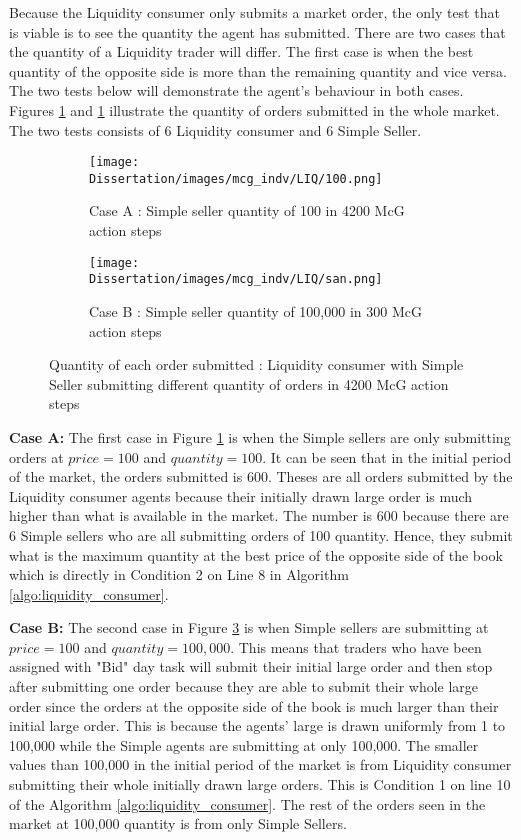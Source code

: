 Because the Liquidity consumer only submits a market order, the only test that is viable is to see the quantity the agent has submitted. There are two cases that the quantity of a Liquidity trader will differ. The first case is when the best quantity of the opposite side is more than the remaining quantity and vice versa. The two tests below will demonstrate the agent's behaviour in both cases. Figures \ref{fig:liq_indv_1} and \ref{fig:liq_indv_1} illustrate the quantity of orders submitted in the whole market. The two tests consists of 6 Liquidity consumer and 6 Simple Seller. 

\begin{figure}[h]
  \begin{subfigure}[b]{0.5\textwidth}
    \texttt{[image: Dissertation/images/mcg\_indv/LIQ/100.png]}
    \caption{Case A : Simple seller quantity of 100 in 4200 McG action steps}
    \label{fig:liq_indv_1}
  \end{subfigure}
  \begin{subfigure}[b]{0.5\textwidth}
    \texttt{[image: Dissertation/images/mcg\_indv/LIQ/san.png]}
    \caption{Case B : Simple seller quantity of 100,000 in 300 McG action steps}
    \label{fig:liq_indv_2}
  \end{subfigure}
\caption{Quantity of each order submitted : Liquidity consumer with Simple Seller submitting different quantity of orders in 4200 McG action steps} 
\end{figure}
\FloatBarrier

\textbf{Case A:} The first case in Figure \ref{fig:liq_indv_1} is when the Simple sellers are only submitting orders at $price = 100$ and $quantity = 100$. It can be seen that in the initial period of the market, the orders submitted is 600. Theses are all orders submitted by the Liquidity consumer agents because their initially drawn large order is much higher than what is available in the market. The number is 600 because there are 6 Simple sellers who are all submitting orders of 100 quantity. Hence, they submit what is the maximum quantity at the best price of the opposite side of the book which is directly in Condition 2 on Line 8 in Algorithm \ref{algo:liquidity_consumer}. 

\textbf{Case B:} The second case in Figure \ref{fig:liq_indv_2} is when Simple sellers are submitting at $price = 100$ and $quantity = 100,000$. This means that traders who have been assigned with "Bid" day task will submit their initial large order and then stop after submitting one order because they are able to submit their whole large order since the orders at the opposite side of the book is much larger than their initial large order. This is because the agents' large is drawn uniformly from 1 to 100,000 while the Simple agents are submitting at only 100,000. The smaller values than 100,000 in the initial period of the market is from Liquidity consumer submitting their whole initially drawn large orders. This is Condition 1 on line 10 of the Algorithm \ref{algo:liquidity_consumer}. The rest of the orders seen in the market at 100,000 quantity is from only Simple Sellers.

